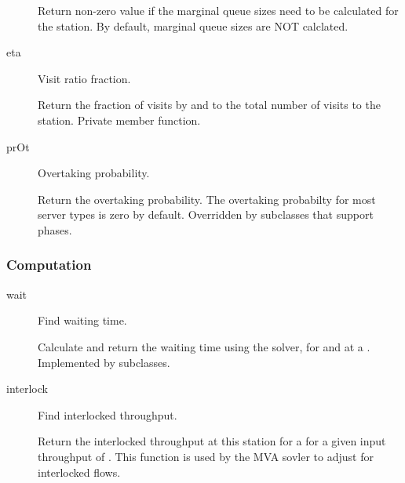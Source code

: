 \begin{description}
  Return non-zero value if the marginal queue sizes need to be
  calculated for the station.  By default, marginal queue sizes are NOT
  calclated. 

  \label{sec:server-eta}
\item[eta] \texonly{---} Visit ratio fraction.\\

  Return the fraction of visits by  and  to the total
  number of visits to the station.  Private member function.

\item[prOt] \texonly{---} Overtaking probability.\\

  Return the overtaking probability.  The overtaking probabilty for most
  server types is zero by default.  Overridden by subclasses that
  support phases.

\end{description}

\subsubsection{Computation}

\begin{description}
\item[wait] \texonly{---} Find waiting time. \\

  Calculate and return the waiting time using the 
  solver,  for   and  
  at a  .  Implemented by subclasses.

\item[interlock] \texonly{---} Find interlocked throughput.\\

  Return the interlocked throughput at this station for a 
   for a given input throughput of .  This function
  is used by the MVA sovler to adjust for interlocked flows.

\end{description}

